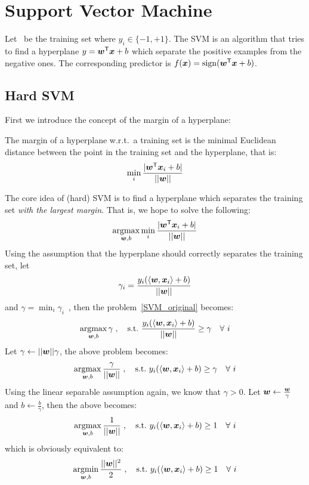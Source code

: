 \section{Support Vector Machine}
Let \dataset\ be the training set where $y_i \in\{-1, +1\}$. The SVM is an algorithm that tries to find a 
hyperplane $y = {\boldsymbol{w}}^\mathsf{T}\boldsymbol{x} + b$ which separate the positive examples from the negative ones. The 
corresponding predictor is $f(\boldsymbol{x}) = \operatorname{sign}({\boldsymbol{w}}^\mathsf{T}\boldsymbol{x} + b)$.

\subsection{Hard SVM}
First we introduce the concept of the margin of a hyperplane:
\begin{df}[Margin]
    The margin of a hyperplane w.r.t.\ a training set is the minimal Euclidean distance between the point in the 
    training set and the hyperplane, that is:
    \begin{equation*}
    \min_i \frac{|{\boldsymbol{w}}^\mathsf{T}\boldsymbol{x}_i + b|}{||\boldsymbol{w}||}
    \end{equation*}
\end{df}

The core idea of (hard) SVM is to find a hyperplane which separates the training set
\textit{with the largest margin}. That is, we hope to solve the following:
\begin{equation}\label{SVM_original}
    \operatorname*{argmax}_{\boldsymbol{w}, b}\min_i \frac{|{\boldsymbol{w}}^\mathsf{T}\boldsymbol{x}_i + b|}{||\boldsymbol{w}||}
\end{equation}
Using the assumption that the hyperplane should correctly separates the training set, let
$$\gamma_i = \frac{y_i(\langle\boldsymbol{w}, \boldsymbol{x}_i\rangle + b)}{||\boldsymbol{w}||}$$
and $\gamma =\displaystyle \min_i \gamma_i$~, then the problem~\eqref{SVM_original} becomes:
\begin{equation}
    \operatorname*{argmax}_{\boldsymbol{w}, b} \gamma\;,\quad \text{s.t.\ } \frac{y_i(\langle\boldsymbol{w}, \boldsymbol{x}_i\rangle + b)}{||\boldsymbol{w}||} \geq \gamma
    \quad\forall\ i
\end{equation}
Let $\gamma \gets ||\boldsymbol{w}||\gamma$, the above problem becomes:
\begin{equation}
    \operatorname*{argmax}_{\boldsymbol{w}, b} \frac{\gamma}{||\boldsymbol{w}||}\;,\quad \text{s.t.\ } y_i(\langle\boldsymbol{w}, \boldsymbol{x}_i\rangle + b) \geq \gamma
    \quad\forall\ i
\end{equation}
Using the linear separable assumption again, we know that $\gamma > 0$. Let $\boldsymbol{w} \gets \frac{\boldsymbol{w}}{\gamma}$
and $b \gets \frac{b}{\gamma}$, then the above becomes:
\begin{equation}
    \operatorname*{argmax}_{\boldsymbol{w}, b} \frac{1}{||\boldsymbol{w}||}\;,\quad \text{s.t.\ } y_i(\langle\boldsymbol{w}, \boldsymbol{x}_i\rangle + b) \geq 1
    \quad\forall\ i
\end{equation}
which is obviously equivalent to:
\begin{equation}\label{hard_SVM}
    \operatorname*{argmin}_{\boldsymbol{w}, b} \frac{||\boldsymbol{w}||^2}{2}\;,\quad \text{s.t.\ } y_i(\langle\boldsymbol{w}, \boldsymbol{x}_i\rangle + b) \geq 1
    \quad\forall\ i
\end{equation}

